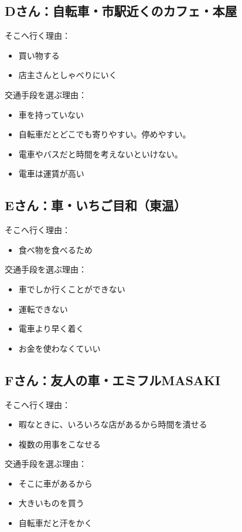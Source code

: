 \documentclass[a4paper,12pt, uplatex]{jsbook}
\begin{document}
\subsection{Dさん：自転車・市駅近くのカフェ・本屋}
そこへ行く理由：
\begin{itemize}
  \item 買い物する
  \item 店主さんとしゃべりにいく
\end{itemize}

交通手段を選ぶ理由：
\begin{itemize}
  \item 車を持っていない
  \item 自転車だとどこでも寄りやすい。停めやすい。
  \item 電車やバスだと時間を考えないといけない。
  \item 電車は運賃が高い
\end{itemize}

\subsection{Eさん：車・いちご目和（東温）}
そこへ行く理由：
\begin{itemize}
  \item 食べ物を食べるため
\end{itemize}

交通手段を選ぶ理由：
\begin{itemize}
  \item 車でしか行くことができない
  \item 運転できない
  \item 電車より早く着く
  \item お金を使わなくていい
\end{itemize}

\subsection{Fさん：友人の車・エミフルMASAKI}
そこへ行く理由：
\begin{itemize}
  \item 暇なときに、いろいろな店があるから時間を潰せる
  \item 複数の用事をこなせる
\end{itemize}

交通手段を選ぶ理由：
\begin{itemize}
  \item そこに車があるから
  \item 大きいものを買う
  \item 自転車だと汗をかく
\end{itemize}
\end{document}
